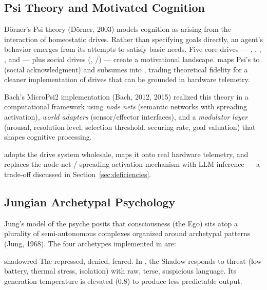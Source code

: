 \documentclass[11pt,oneside]{article}
\begin{document}
\subsection{Psi Theory and Motivated Cognition}

D\"orner's Psi theory (D\"orner, 2003) models cognition as arising from the interaction of homeostatic drives.
Rather than specifying goals directly, an agent's behavior emerges from its attempts to satisfy basic needs.
Five core drives --- , , , , and  --- plus social drives (, /) --- create a motivational landscape.
\jungagent{} maps Psi's  to  (social acknowledgment) and subsumes  into , trading theoretical fidelity for a cleaner implementation of drives that can be grounded in hardware telemetry.

Bach's MicroPsi2 implementation (Bach, 2012, 2015) realized this theory in a computational framework using \emph{node nets} (semantic networks with spreading activation), \emph{world adapters} (sensor/effector interfaces), and a \emph{modulator layer} (arousal, resolution level, selection threshold, securing rate, goal valuation) that shapes cognitive processing.

\jungagent{} adopts the drive system wholesale, maps it onto real hardware telemetry, and replaces the node net / spreading activation mechanism with LLM inference --- a trade-off discussed in Section~\ref{sec:deficiencies}.

\subsection{Jungian Archetypal Psychology}

Jung's model of the psyche posits that consciousness (the Ego) sits atop a plurality of semi-autonomous complexes organized around archetypal patterns (Jung, 1968).
The four archetypes implemented in \jungagent{} are:

\begin{archetype}[Shadow]{shadowred}
The repressed, denied, feared.
In \jungagent{}, the Shadow responds to threat (low battery, thermal stress, isolation) with raw, terse, suspicious language.
Its generation temperature is elevated (0.8) to produce less predictable output.
\end{archetype}
\end{document}
